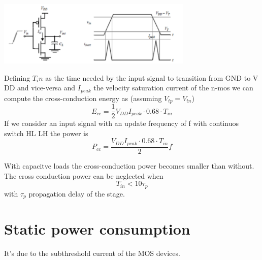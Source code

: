 \centering
\includegraphics[width=0.7\textwidth]{C4_1.png}\\
\raggedright

Defining $T_in$ as the time needed by the input signal to transition from GND to V DD and vice-versa and $I_{peak}$ the velocity saturation current of the n-mos we can compute the cross-conduction energy as (assuming $V_{tp}=V_{tn}$) 
\begin{equation}
E_{cc}= \frac{1}{2} V_{DD}I_{peak}\cdot 0.68 \cdot T_{in}
\end{equation}
If we consider an input signal with an update frequency of f with continuos switch HL LH the power is 
\begin{equation}
P_{cc}=\frac{V_{DD}I_{peak} \cdot 0.68 \cdot T_{in}}{2} f
\end{equation}

\vspace{5mm}

With capacitve loads the cross-conduction power becomes smaller than without.\\ 
The cross conduction power can be neglected when 
\begin{equation}
T_{in}<10\tau_p
\end{equation}
with $\tau_p$ propagation delay of the stage.\\


\section{Static power consumption}
It's due to the subthreshold current of the MOS devices.

